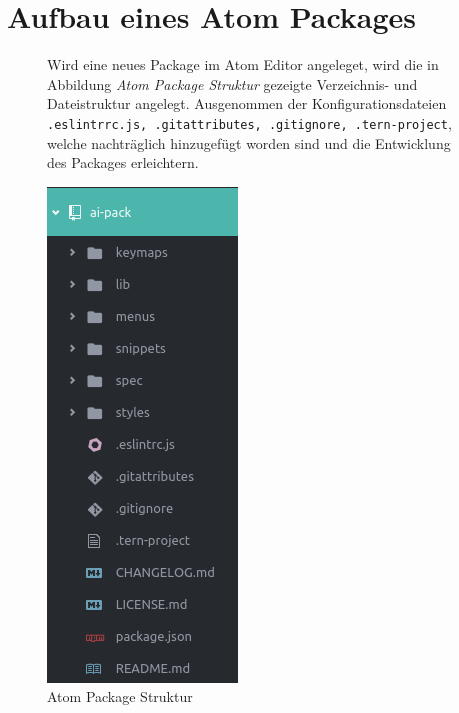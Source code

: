     \section{Aufbau eines Atom Packages}
        \begin{figure}[htbp]
            \begin{minipage}{0.6\textwidth}
                Wird eine neues Package im Atom Editor angeleget, wird die in Abbildung \textit{Atom Package Struktur} gezeigte Verzeichnis- und Dateistruktur angelegt. Ausgenommen der Konfigurationsdateien \texttt{.eslintrrc.js, .gitattributes, .gitignore, .tern-project}, welche nachträglich hinzugefügt worden sind und die Entwicklung des Packages erleichtern.
            \end{minipage}
            \begin{minipage}{0.4\textwidth}
                \centering
                \includegraphics[scale=0.5]{img/package_structure.png}
                \caption{Atom Package Struktur}
            \end{minipage}
        \end{figure}

